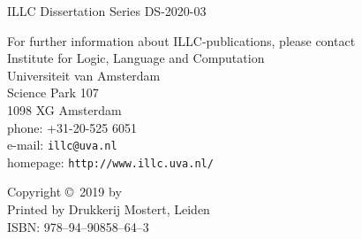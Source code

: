 
{\pagestyle{empty}

\newcommand{\printtitle}{{\Huge\bf \thetitle}}

\begin{titlepage}
\par\vskip 2cm
\begin{center}
\printtitle
\vfill
{\LARGE\bf \theauthor}
\vskip 2cm
\end{center}
\end{titlepage}

\mbox{}\newpage
\setcounter{page}{1}

\par\vskip 2cm
\begin{center}
\printtitle
\end{center}

\clearpage
\par\vskip 2cm
\begin{center}
ILLC Dissertation Series DS-2020-03
\par\vspace {2cm}
\illclogo{10cm}
\par\vspace {2cm}
\noindent%
For further information about ILLC-publications, please contact\\[2ex]
Institute for Logic, Language and Computation\\
Universiteit van Amsterdam\\
Science Park 107\\
1098 XG Amsterdam\\
phone: +31-20-525 6051\\
e-mail: {\tt illc@uva.nl}\\
homepage: {\tt http://www.illc.uva.nl/}
\end{center}
\vfill

\noindent%
Copyright \copyright\ 2019 by \theauthor \\[2ex]
Printed by Drukkerij Mostert, Leiden \\[2ex]
ISBN: 978--94--90858--64--3

}
